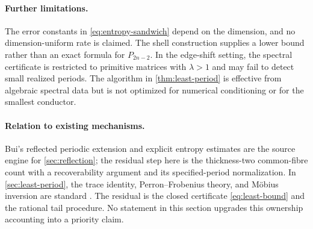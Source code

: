 \paragraph{Further limitations.}
The error constants in \cref{eq:entropy-sandwich} depend on the dimension,
and no dimension-uniform rate is claimed.  The shell construction supplies a
lower bound rather than an exact formula for $P_{2n-2}$.  In the edge-shift
setting, the spectral certificate is restricted to primitive matrices with
$\lambda>1$ and may fail to detect small realized periods.  The algorithm in
\cref{thm:least-period} is effective from algebraic spectral data but is not
optimized for numerical conditioning or for the smallest conductor.

\paragraph{Relation to existing mechanisms.}
Bui's reflected periodic extension and explicit entropy estimates
\cite{Bui2026} are the source engine for \cref{sec:reflection}; the residual
step here is the thickness-two common-fibre count with a recoverability
argument and its specified-period normalization.  In
\cref{sec:least-period}, the trace identity, Perron--Frobenius theory, and
M\"obius inversion are standard \cite{LindMarcus2021}.  The residual is the
closed certificate \cref{eq:least-bound} and the rational tail procedure.
No statement in this section upgrades this ownership accounting into a
priority claim.

